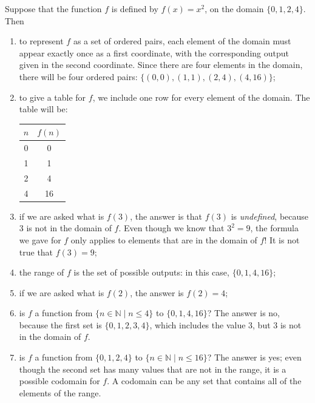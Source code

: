 \begin{example}{}
Suppose that the function $f$ is defined by $f(x)=x^2$, on the domain $\{0,1,2,4\}$.  Then
\begin{enumerate}
\item to represent $f$ as a set of ordered pairs, each element of the domain must appear exactly once as a first coordinate, with the corresponding output given in the second coordinate.  Since there are four elements in the domain, there will be four ordered pairs: $\{(0,0), (1,1), (2,4), (4,16)\}$;
\item to give a table for $f$, we include one row for every element of the domain.  The table will be:
\begin{center}
\begin{tabular}{|c|c|}
\hline
$n$ & $f(n)$ \\
\hline
0 & 0 \\
 1 & 1 \\
 2  & 4 \\
 4 & 16 \\
\hline
\end{tabular}
\end{center}
\item if we are asked what is $f(3)$, the answer is that $f(3)$ is \emph{undefined}, because 3 is not in the domain of $f$.  Even though we know that $3^2=9$, the formula we gave for $f$ only applies to elements that are in the domain of $f$! It is not true that $f(3)=9$;
\item the range of $f$ is the set of possible outputs: in this case, $\{0,1,4,16\}$;
\item if we are asked what is $f(2)$, the answer is $f(2)=4$;
\item is $f$ a function from $\{n \in \mathbb{N} \mid n \le 4\}$ to $\{0,1,4,16\}$?  The answer is no, because the first set is $\{0,1,2,3,4\}$, which includes the value $3$, but $3$ is not in the domain of $f$.
\item is $f$ a function from $\{0,1,2,4\}$ to $\{ n \in \mathbb{N} \mid n \le 16\}$?  The answer is yes; even though the second set has many values that are not in the range, it is a possible codomain for $f$.  A codomain can be any set that contains all of the elements of the range.
\end{enumerate}
\end{example}



